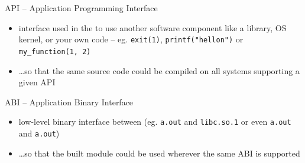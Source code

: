 

\begin{slide}

API -- Application Programming Interface

\begin{itemize}
\item interface used in the  to use another software
component like a library, OS kernel, or your own code -- eg.
\texttt{exit(1)}, \texttt{printf("hello\bs{}n")} or \texttt{my\_function(1,
2)}
\item \dots{}so that the same source code could be compiled on all systems
supporting a given API
\end{itemize}

ABI -- Application Binary Interface

\begin{itemize}
\item low-level binary interface between  (eg.  \texttt{a.out}
and \texttt{libc.so.1} or even \texttt{a.out} and \texttt{a.out})
\item \dots{}so that the built module could be used wherever the same ABI is
supported
\end{itemize}
\end{slide}

\label{API_ABI}

